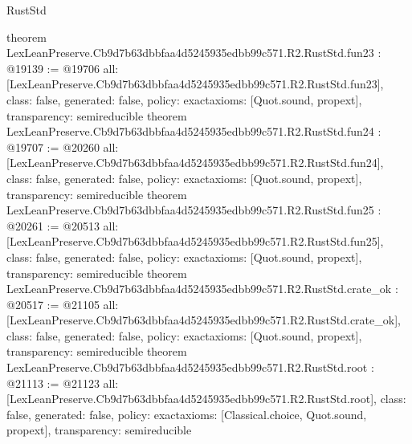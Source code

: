 \begin{lexlean}{RustStd}
\begin{coremodule}
{}
theorem LexLeanPreserve.Cb9d7b63dbbfaa4d5245935edbb99c571.R2.RustStd.fun23 : @19139 := @19706 {
  all: [LexLeanPreserve.Cb9d7b63dbbfaa4d5245935edbb99c571.R2.RustStd.fun23],
  class: false,
  generated: false,
  policy: exact{axioms: [Quot.sound, propext]},
  transparency: semireducible
}
theorem LexLeanPreserve.Cb9d7b63dbbfaa4d5245935edbb99c571.R2.RustStd.fun24 : @19707 := @20260 {
  all: [LexLeanPreserve.Cb9d7b63dbbfaa4d5245935edbb99c571.R2.RustStd.fun24],
  class: false,
  generated: false,
  policy: exact{axioms: [Quot.sound, propext]},
  transparency: semireducible
}
theorem LexLeanPreserve.Cb9d7b63dbbfaa4d5245935edbb99c571.R2.RustStd.fun25 : @20261 := @20513 {
  all: [LexLeanPreserve.Cb9d7b63dbbfaa4d5245935edbb99c571.R2.RustStd.fun25],
  class: false,
  generated: false,
  policy: exact{axioms: [Quot.sound, propext]},
  transparency: semireducible
}
theorem LexLeanPreserve.Cb9d7b63dbbfaa4d5245935edbb99c571.R2.RustStd.crate_ok : @20517 := @21105 {
  all: [LexLeanPreserve.Cb9d7b63dbbfaa4d5245935edbb99c571.R2.RustStd.crate_ok],
  class: false,
  generated: false,
  policy: exact{axioms: [Quot.sound, propext]},
  transparency: semireducible
}
theorem LexLeanPreserve.Cb9d7b63dbbfaa4d5245935edbb99c571.R2.RustStd.root : @21113 := @21123 {
  all: [LexLeanPreserve.Cb9d7b63dbbfaa4d5245935edbb99c571.R2.RustStd.root],
  class: false,
  generated: false,
  policy: exact{axioms: [Classical.choice, Quot.sound, propext]},
  transparency: semireducible
}


\end{coremodule}
\end{lexlean}
